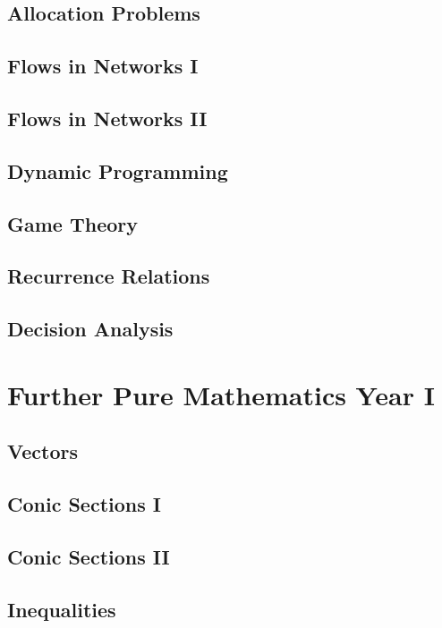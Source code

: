 \documentclass{book}
\begin{document}
    \section{Allocation Problems} \label{allocation_problems}
    \newpage
    \section{Flows in Networks I} \label{flows_in_networks_i}
    \newpage
    \section{Flows in Networks II} \label{flows_in_networks_ii}
    \newpage
    \section{Dynamic Programming} \label{dynamic_programming}
    \newpage
    \section{Game Theory} \label{game_theory}
    \newpage
    \section{Recurrence Relations} \label{recurrence_relations}
    \newpage
    \section{Decision Analysis} \label{decision_analysis}
    \newpage


\chapter{Further Pure Mathematics Year I} \label{ch:pure_i}
    \section{Vectors} \label{}
    \newpage
    \section{Conic Sections I} \label{}
    \newpage
    \section{Conic Sections II} \label{}
    \newpage
    \section{Inequalities} \label{}
    \newpage
\end{document}

